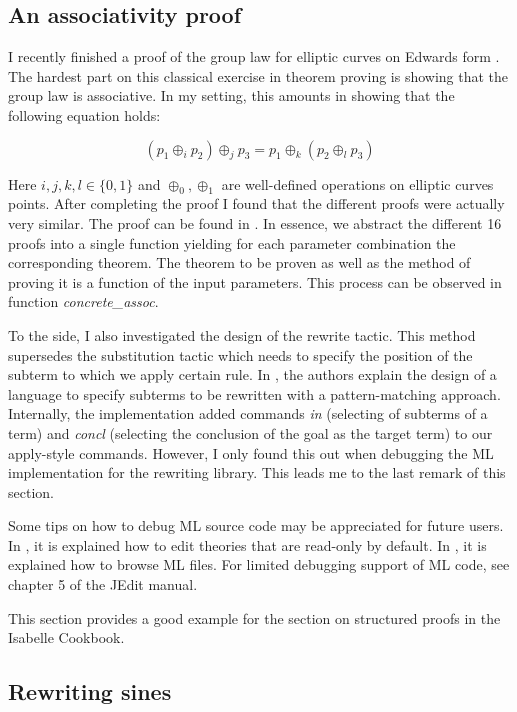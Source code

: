 \documentclass[notitlepage]{article}
\begin{document}
\subsection{An associativity proof}

I recently finished a proof of the group law for elliptic curves on Edwards form \cite{Gauss_Sums-AFP}. The hardest part on this classical exercise in theorem proving is showing that the group law is associative. In my setting, this amounts in showing that the following equation holds:

\[
(p_1 \oplus_i p_2) \oplus_j p_3 = p_1 \oplus_k (p_2 \oplus_l p_3)
\]

Here $i,j,k,l \in \{0,1\}$ and $\oplus_0,\oplus_1$ are well-defined operations on elliptic curves points. After completing the proof I found that the different proofs were actually very similar. The proof can be found in \cite{associativity}. In essence, we abstract the different 16 proofs into a single function yielding for each parameter combination the corresponding theorem. The theorem to be proven as well as the method of proving it is a function of the input parameters. This process can be observed in function \textit{concrete\_assoc}.

To the side, I also investigated the design of the rewrite tactic. This method supersedes the substitution tactic which needs to specify the position of the subterm to which we apply certain rule. In \cite{noschinskipattern}, the authors explain the design of a language to specify subterms to be rewritten with a pattern-matching approach. Internally, the implementation added commands \textit{in} (selecting of subterms of a term) and \textit{concl} (selecting the conclusion of the goal as the target term) to our apply-style commands. However, I only found this out when debugging the ML implementation for the rewriting library. This leads me to the last remark of this section.

Some tips on how to debug ML source code may be appreciated for future users. In \cite{explore}, it is explained how to edit theories that are read-only by default. In \cite{navigate}, it is explained how to browse ML files. For limited debugging support of ML code, see chapter 5 of the JEdit manual.

This section provides a good example for the section on structured proofs in the Isabelle Cookbook. 

\subsection{Rewriting sines}
\end{document}

